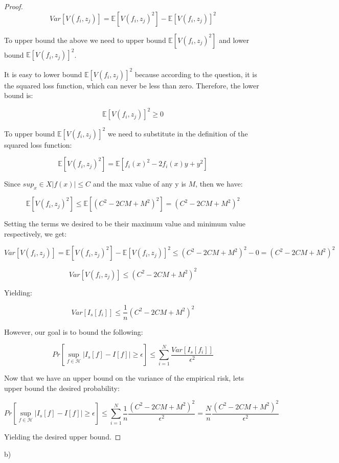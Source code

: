 \documentclass[12pt]{report}
\begin{document}
\begin{proof}
$$Var[V(f_i,z_j)] = \mathbb{E}[V(f_i,z_j)^2] - \mathbb{E}[V(f_i,z_j)]^2$$

To upper bound the above we need to upper bound $\mathbb{E}[V(f_i,z_j)^2]$ and lower bound $\mathbb{E}[V(f_i,z_j)]^2$. 

It is easy to lower bound $\mathbb{E}[V(f_i,z_j)]^2$ because according to the question, it is the squared loss function, which can never be less than zero. Therefore, the lower bound is:

$$\mathbb{E}[V(f_i,z_j)]^2 \geq 0$$

To upper bound  $\mathbb{E}[V(f_i,z_j)]^2$ we need to substitute in the definition of the squared loss function:

$$\mathbb{E}[V(f_i,z_j)^2] = \mathbb{E}[f_i(x)^2 - 2f_i(x)y + y^2] $$

Since $sup_x \in X |f(x)| \leq C$ and the max value of any y is $M$, then we have:


$$\mathbb{E}[V(f_i,z_j)^2] \leq \mathbb{E}[(C^2 - 2CM + M^2)^2] = (C^2 - 2CM + M^2)^2 $$

Setting the terms we desired to be their maximum value and minimum value respectively, we get:

$$Var[V(f_i,z_j)] = \mathbb{E}[V(f_i,z_j)^2] - \mathbb{E}[V(f_i,z_j)]^2 \leq (C^2 - 2CM + M^2)^2 - 0 = (C^2 - 2CM + M^2)^2 $$

$$Var[V(f_i,z_j)] \leq (C^2 - 2CM + M^2)^2$$

Yielding: 

$$Var[I_s[f_i]] \leq \frac{1}{n} (C^2 - 2CM + M^2)^2$$

However, our goal is to bound the following:

$$Pr[ \sup\limits_{f \in \mathcal{H}}  | I_s[f] - I[f] | \geq \epsilon] \leq \sum^{N}_{i=1} \frac{ Var[I_s[f_i]] }{ \epsilon^2 }$$

Now that we have an upper bound on the variance of the empirical risk, lets upper bound the desired probability:

$$Pr[ \sup\limits_{f \in \mathcal{H}}  | I_s[f] - I[f] | \geq \epsilon] \leq \sum^{N}_{i=1} \frac{1}{n} \frac{ (C^2 - 2CM + M^2)^2 }{ \epsilon^2 } = \frac{N}{n} \frac{ (C^2 - 2CM + M^2)^2 }{ \epsilon^2 }$$

Yielding the desired upper bound.
\end{proof}

b)

\end{document}
